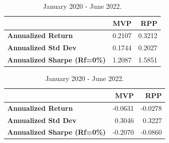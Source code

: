 \begin{frame}[t]
	\begin{table}[!htb]
		\begin{minipage}{.5\linewidth}
			\begin{table}[!htb]
				\centering
				\begingroup
				\fontsize{7}{7}
				\selectfont
				\begin{tabular}{>{}lrr}
					\toprule
					                                    & MVP    & RPP    \\
					\midrule
					\textbf{Annualized Return}          & 0.2107 & 0.3212 \\
					\textbf{Annualized Std Dev}         & 0.1744 & 0.2027 \\
					\textbf{Annualized Sharpe (Rf=0\%)} & 1.2087 & 1.5851 \\
					\bottomrule
				\end{tabular} \caption{January 2017 - December 2019.}
				\endgroup{}
			\end{table}
		\end{minipage}%
		\begin{minipage}{.5\linewidth}
			\begin{table}[!htb]
				\centering
				\begingroup
				\fontsize{7}{7}
				\selectfont
				\begin{tabular}{>{}lrr}
					\toprule
					                                    & MVP     & RPP     \\
					\midrule
					\textbf{Annualized Return}          & -0.0631 & -0.0278 \\
					\textbf{Annualized Std Dev}         & 0.3046  & 0.3227  \\
					\textbf{Annualized Sharpe (Rf=0\%)} & -0.2070 & -0.0860 \\
					\bottomrule
				\end{tabular}
				\caption{January 2020 - June 2022.}
				\endgroup{}
			\end{table}
		\end{minipage}
	\end{table}
\end{frame}